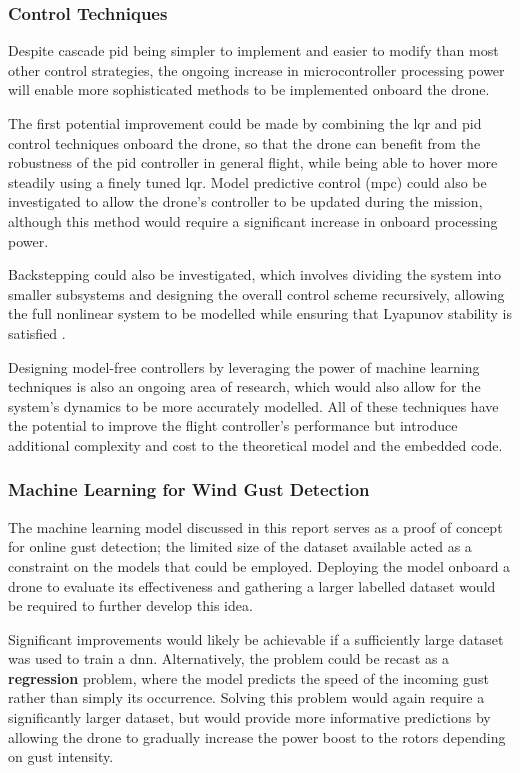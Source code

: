\subsubsection{Control Techniques}
\label{sec:modelfree}

Despite cascade \gls{pid} being simpler to implement and easier to modify than most other control strategies, the ongoing increase in microcontroller processing power will enable more sophisticated methods to be implemented onboard the drone.

The first potential improvement could be made by combining the \gls{lqr} and \gls{pid} control techniques onboard the drone, so that the drone can benefit from the robustness of the \gls{pid} controller in general flight, while being able to hover more steadily using a finely tuned \gls{lqr}. Model predictive control (\acrshort{mpc}) could also be investigated to allow the drone's controller to be updated during the mission, although this method would require a significant increase in onboard processing power. 

Backstepping could also be investigated, which involves dividing the system into smaller subsystems and designing the overall control scheme recursively, allowing the full nonlinear system to be modelled while ensuring that Lyapunov stability is satisfied \cite{4058900}. 

Designing model-free controllers by leveraging the power of machine learning techniques is also an ongoing area of research, which would also allow for the system's dynamics to be more accurately modelled. All of these techniques have the potential to improve the flight controller's performance but introduce additional complexity and cost to the theoretical model and the embedded code.

\subsubsection{Machine Learning for Wind Gust Detection}

The machine learning model discussed in this report serves as a proof of concept for online gust detection; the limited size of the dataset available acted as a constraint on the models that could be employed. Deploying the model onboard a drone to evaluate its effectiveness and gathering a larger labelled dataset would be required to further develop this idea. 

Significant improvements would likely be achievable if a sufficiently large dataset was used to train a \gls{dnn}. Alternatively, the problem could be recast as a \textbf{regression} problem, where the model predicts the speed of the incoming gust rather than simply its occurrence. Solving this problem would again require a significantly larger dataset, but would provide more informative predictions by allowing the drone to gradually increase the power boost to the rotors depending on gust intensity.



